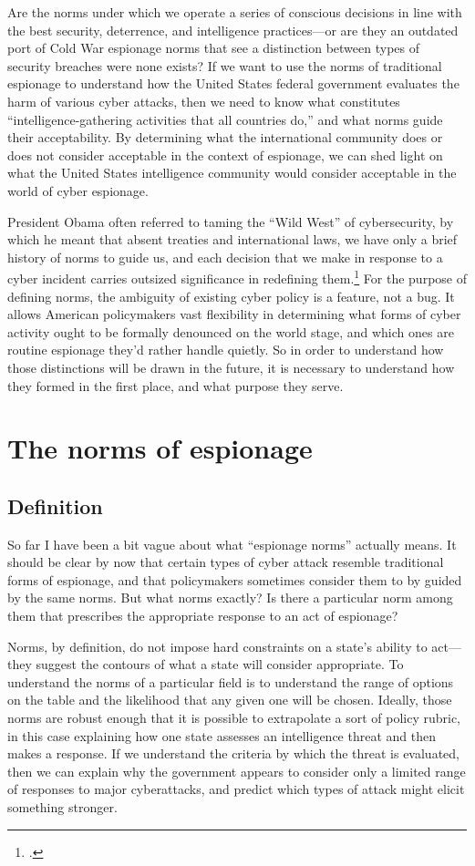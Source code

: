 \documentclass{report}
\begin{document}
\begin{refsegment}
Are the norms under which we operate a series of conscious decisions in line with the best security, deterrence, and intelligence practices---or are they an outdated port of Cold War espionage norms that see a distinction between types of security breaches were none exists? If we want to use the norms of traditional espionage to understand how the United States federal government evaluates the harm of various cyber attacks, then we need to know what constitutes ``intelligence-gathering activities that all countries do,'' and what norms guide their acceptability. By determining what the international community does or does not consider acceptable in the context of espionage, we can shed light on what the United States intelligence community would consider acceptable in the world of cyber espionage.

President Obama often referred to taming the ``Wild West'' of cybersecurity, by which he meant that absent treaties and international laws, we have only a brief history of norms to guide us, and each decision that we make in response to a cyber incident carries outsized significance in redefining them.\footcite{sanger_u.s._2016} For the purpose of defining norms, the ambiguity of existing cyber policy is a feature, not a bug. It allows American policymakers vast flexibility in determining what forms of cyber activity ought to be formally denounced on the world stage, and which ones are routine espionage they'd rather handle quietly. So in order to understand how those distinctions will be drawn in the future, it is necessary to understand how they formed in the first place, and what purpose they serve.

\section{The norms of espionage}
\subsection{Definition}
So far I have been a bit vague about what ``espionage norms'' actually means. It should be clear by now that certain types of cyber attack resemble traditional forms of espionage, and that policymakers sometimes consider them to by guided by the same norms. But what norms exactly? Is there a particular norm among them that prescribes the appropriate response to an act of espionage?

Norms, by definition, do not impose hard constraints on a state's ability to act---they suggest the contours of what a state will consider appropriate. To understand the norms of a particular field is to understand the range of options on the table and the likelihood that any given one will be chosen. Ideally, those norms are robust enough that it is possible to extrapolate a sort of policy rubric, in this case explaining how one state assesses an intelligence threat and then makes a response. If we understand the criteria by which the threat is evaluated, then we can explain why the government appears to consider only a limited range of responses to major cyberattacks, and predict which types of attack might elicit something stronger.


\end{refsegment}
\end{document}
